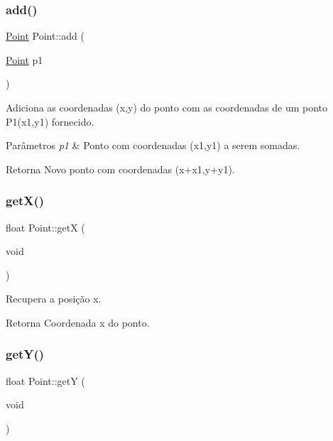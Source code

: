 \subsubsection{\texorpdfstring{add()}{add()}}
{\footnotesize\ttfamily \hyperlink{class_point}{Point} Point\+::add (\begin{DoxyParamCaption}\item[{\hyperlink{class_point}{Point}}]{p1 }\end{DoxyParamCaption})}



Adiciona as coordenadas (x,y) do ponto com as coordenadas de um ponto P1(x1,y1) fornecido. 


\begin{DoxyParams}{Parâmetros}
{\em p1} & Ponto com coordenadas (x1,y1) a serem somadas. \\
\hline
\end{DoxyParams}
\begin{DoxyReturn}{Retorna}
Novo ponto com coordenadas (x+x1,y+y1). 
\end{DoxyReturn}
\mbox{\label{class_point_a9aa94b8fd07296e64d304ef3750db113}} 
\subsubsection{\texorpdfstring{get\+X()}{getX()}}
{\footnotesize\ttfamily float Point\+::getX (\begin{DoxyParamCaption}\item[{void}]{ }\end{DoxyParamCaption})}



Recupera a posição x. 

\begin{DoxyReturn}{Retorna}
Coordenada x do ponto. 
\end{DoxyReturn}
\mbox{\label{class_point_a2444daa96871c89614510bc4bfcd19ce}} 
\subsubsection{\texorpdfstring{get\+Y()}{getY()}}
{\footnotesize\ttfamily float Point\+::getY (\begin{DoxyParamCaption}\item[{void}]{ }\end{DoxyParamCaption})}



